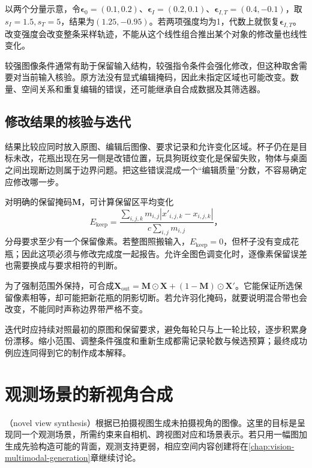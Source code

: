 以两个分量示意，令$\bm{\epsilon}_0=(0.1,0.2)$、$\bm{\epsilon}_I=(0.2,0.1)$、$\bm{\epsilon}_{I,T}=(0.4,-0.1)$，取$s_I=1.5,s_T=5$，结果为$(1.25,-0.95)$。若两项强度均为1，代数上就恢复$\bm{\epsilon}_{I,T}$。改变强度会改变整条采样轨迹，不能从这个线性组合推出某个对象的修改量也线性变化。

较强图像条件通常有助于保留输入结构，较强指令条件会强化修改，但这种取舍需要对当前输入核验。原方法没有显式编辑掩码，因此未指定区域也可能改变。数量、空间关系和重复编辑的错误，还可能继承自合成数据及其筛选器。

\subsection{修改结果的核验与迭代}
\label{sec:vision-generation-editing-check}

结果比较应同时放入原图、编辑后图像、要求记录和允许变化区域。杯子仍在是目标未改，花瓶出现在另一侧是改错位置，玩具狗斑纹变化是保留失败，物体与桌面之间出现断边则属于边界问题。把这些错误混成一个“编辑质量”分数，不容易确定应修改哪一步。

对明确的保留掩码$\bm{M}$，可计算保留区平均变化
\begin{equation}
 E_{\mathrm{keep}}=
 \frac{\sum_{i,j,k}m_{i,j}
       |x'_{i,j,k}-x_{i,j,k}|}
 {c\sum_{i,j}m_{i,j}}\text{，}
 \label{eq:vision-edit-preservation}
\end{equation}
分母要求至少有一个保留像素。若整图照搬输入，$E_{\mathrm{keep}}=0$，但杯子没有变成花瓶；因此这项必须与修改完成度一起报告。允许全图色调变化时，逐像素保留误差也需要换成与要求相符的判断。

为了强制范围外保持，可合成$\bm{X}_{\mathrm{out}}=\bm{M}\odot\bm{X}+(1-\bm{M})\odot\bm{X}'$。它能保证所选保留像素相等，却可能把新花瓶的阴影切断。若允许羽化掩码，就要说明混合带也会改变，不能同时声称边界带严格不变。

迭代时应持续对照最初的原图和保留要求，避免每轮只与上一轮比较，逐步积累身份漂移。缩小范围、调整条件强度和重新生成都需记录轮数与候选预算；最终成功例应连同得到它的制作成本解释。

\section{观测场景的新视角合成}
\label{sec:vision-generation-novel-view}

（novel view synthesis）根据已拍摄视图生成未拍摄视角的图像。这里的目标是呈现同一个观测场景，所需约束来自相机、跨视图对应和场景表示。若只用一幅图加生成先验构造可能的背面，观测支持更弱，相应空间内容创建将在\ref{chap:vision-multimodal-generation}章继续讨论。

